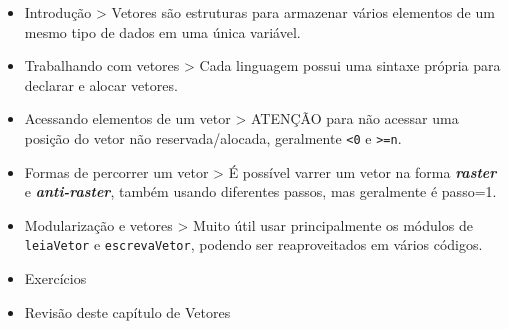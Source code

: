\documentclass[12pt,a4paper]{article}
\providecommand{\tightlist}{%
      \setlength{\itemsep}{0pt}\setlength{\parskip}{0pt}}
\begin{document}
\begin{itemize}
\tightlist
\item
  Introdução \textgreater{} Vetores são estruturas para armazenar vários
  elementos de um mesmo tipo de dados em uma única variável.
\item
  Trabalhando com vetores \textgreater{} Cada linguagem possui uma
  sintaxe própria para declarar e alocar vetores.
\item
  Acessando elementos de um vetor \textgreater{} ATENÇÃO para não
  acessar uma posição do vetor não reservada/alocada, geralmente
  \texttt{\textless{}0} e \texttt{\textgreater{}=n}.
\item
  Formas de percorrer um vetor \textgreater{} É possível varrer um vetor
  na forma \textbf{\emph{raster}} e \textbf{\emph{anti-raster}}, também
  usando diferentes passos, mas geralmente é passo=1.
\item
  Modularização e vetores \textgreater{} Muito útil usar principalmente
  os módulos de \texttt{leiaVetor} e \texttt{escrevaVetor}, podendo ser
  reaproveitados em vários códigos.
\item
  Exercícios
\item
  Revisão deste capítulo de Vetores
\end{itemize}


    
    
    
\end{document}
